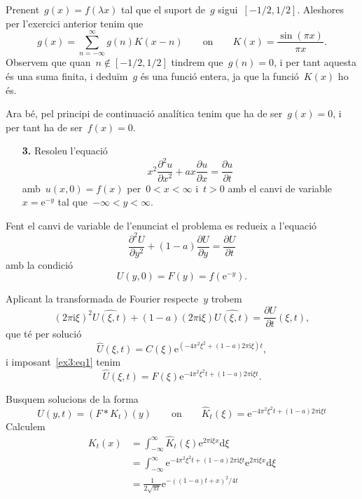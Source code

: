 \documentclass[a4paper]{article}
\theoremstyle{plain}
\theoremstyle{definition}
\newcommand{\iu}{\mathrm{i}}
\newcommand{\e}{\mathrm{e}}
\providecommand{\uppi}{\pi}
\newcommand{\diff}{\mathrm{d}}
\newcommand{\conv}{\mathop{\ast}}
\begin{document}
Prenent~\(g(x)=f(\lambda x)\) tal que el suport de~\(g\) sigui~\([-1/2,1/2]\).
Aleshores per l'exercici anterior tenim que
\[
    g(x)
    =
    \sum_{n=-\infty}^{\infty}
    g(n)
    K(x-n)
    \qquad\text{on}\qquad
    K(x)
    =
    \frac{\sin(\uppi x)}{\uppi x}.
\]
Observem que quan~\(n\notin[-1/2,1/2]\) tindrem que~\(g(n)=0\), i per tant
aquesta és una suma finita, i deduïm~\(g\) és una funció entera, ja que la
funció~\(K(x)\) ho és.

Ara bé, pel principi de continuació analítica tenim que ha de ser~\(g(x)=0\),
i per tant ha de ser~\(f(x)=0\).

\begin{enumerate}
    \item[\textbf{3.}] Resoleu l'equació
        \[
            x^{2}\frac{\partial^{2}u}{\partial x^{2}}
            + ax\frac{\partial u}{\partial x}
            = \frac{\partial u}{\partial t}
        \]
        amb~\(u(x,0) = f(x)\) per~\(0<x<\infty\) i~\(t>0\) amb el canvi de
        variable~\(x=\e^{-y}\) tal que~\(-\infty<y<\infty\).
\end{enumerate}

Fent el canvi de variable de l'enunciat el problema es redueix a l'equació
\[
    \frac{\partial^{2} U}{\partial y^{2}}
    +
    (1 - a)
    \frac{\partial U}{\partial y}
    =
    \frac{\partial U}{\partial t}
\]
amb la condició
\begin{equation}
    \label{ex3:eq1}
    U(y,0) = F(y) = f(\e^{-y}).
\end{equation}

Aplicant la transformada de Fourier respecte~\(y\) trobem
\[
    (2\uppi\iu\xi)^{2}
    \widehat{U(\xi,t)}
    +
    (1 - a)
    (2\uppi\iu\xi)
    \widehat{U(\xi,t)}
    =
    \frac{\partial U}{\partial t}
    (\xi,t),
\]
que té per solució
\[
    \widehat{U}(\xi,t)
    =
    C(\xi)
    \e^{(-4\uppi^{2}\xi^{2}+(1-a)2\uppi\iu\xi)t},
\]
i imposant~\eqref{ex3:eq1} tenim
\[
    \widehat{U}(\xi,t)
    =
    F(\xi)
    \e^{-4\uppi^{2}\xi^{2}t+(1-a)2\uppi\iu\xi t}.
\]

Busquem solucions de la forma
\[
    U(y,t)
    =
    (F\conv K_{t})(y)
    \qquad\text{on}\qquad
    \widehat{K}_{t}(\xi)
    =
    \e^{-4\uppi^{2}\xi^{2}t+(1-a)2\uppi\iu\xi t}
\]
Calculem
\begin{align*}
    K_{t}(x) &= \int_{-\infty}^{\infty}
                \widehat{K}_{t}(\xi)
                \e^{2\uppi\iu\xi x}
                \diff\xi \\
             &= \int_{-\infty}^{\infty}
                \e^{-4\uppi^{2}\xi^{2}t+(1-a)2\uppi\iu\xi t}
                \e^{2\uppi\iu\xi x}
                \diff\xi \\
             &= \frac{1}{2\sqrt{\uppi t}}
             \e^{-{((1-a)t+x)^{2}}/{4t}}
\end{align*}
\end{document}
